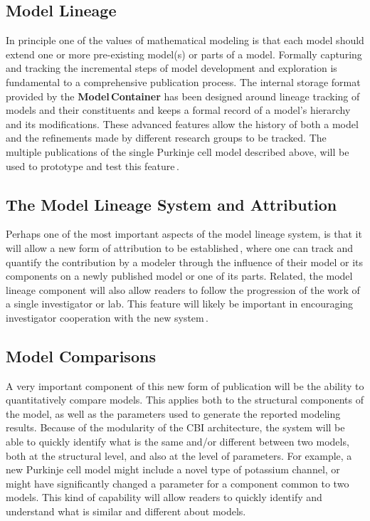 \documentclass[12pt]{article}
\begin{document}
\subsection*{Model Lineage}

In principle one of the values of mathematical modeling is that each model should extend one or more pre-existing model(s) or parts of a model. Formally capturing and tracking the incremental steps of model development and exploration is fundamental to a comprehensive publication process.  The internal storage format provided by the {\bf Model\,Container} has been designed around lineage tracking of models and their constituents and keeps a formal record of a model's hierarchy and its modifications.  These advanced features allow the history of both a model and the refinements made by different research groups to be tracked.  The multiple publications of the single Purkinje cell model described above, will be used to prototype and test this feature\,\cite{Rapp-P:1994qf, De-Schutter-E:1994vn, E:1994hc, schutter94:_simul_purkin, schutter94:_simul_purkin, chono03:_purkin, coop01, miyasho01:_low_ca2_purkin, steuber07:_cereb_ltd_purkin, De-Schutter:2009kl, Kreiner:2004tg, Solinas:2006hc}. 

\subsection*{The Model Lineage System and Attribution}

Perhaps one of the most important aspects of the model lineage system, is that it will allow a new form of attribution to be established\,\cite{Iyengar:2009fu}, where one can track and quantify the contribution by a modeler through the influence  of their model or its components on a newly published model or one of its parts.  Related, the model lineage component will also allow readers to follow the progression of the work of a single investigator or lab.  This feature will likely be important in encouraging investigator cooperation with the new system\,\cite{Thorisson:2009ye}.

\subsection*{Model Comparisons}

A very important component of this new form of publication will be the ability to quantitatively compare models. This applies both to the structural components of the model, as well as the parameters used to generate the reported modeling results. Because of the modularity of the CBI architecture, the system will be able to quickly identify what is the same and/or different between two models, both at the structural level, and also at the level of parameters. For example, a new Purkinje cell model might include a novel type of potassium channel, or might have significantly changed a parameter for a component common to two models. This kind of capability will allow readers to quickly identify and understand what is similar and different about models. 
\end{document}
